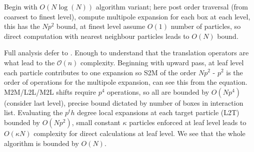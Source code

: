 Begin with $O(N\log(N))$ algorithm variant; here post order traversal (from
coarsest to finest level), compute multipole expansion for each box at each level,
this has the $Np^2$ bound, at finest level assume $O(1)$ number of particles, so
direct computation with nearest neighbour particles leads to $O(N)$ bound.

Full analysis defer to \cite{Greengard:1987:Yale}. Enough to understand that the
translation operators are what lead to the $\mathcal{O}(n)$ complexity. Beginning
with upward pass, at leaf level each particle contributes to one expansion so
S2M of the order $Np^2$ - $p^2$ is the order of operations for the multipole
expansion, can see this from the equation. M2M/L2L/M2L shifts require $p^4$
operations, so all are bounded by $O(Np^4)$ (consider last level), precise bound
dictated by number of boxes in interaction list. Evaluating the $p^th$ degree
local expansions at each target particle (L2T) bounded by $O(Np^2)$, small constant
$\kappa$ particles enforced at leaf level leads to $O(\kappa N)$ complexity for
direct calculations at leaf level. We see that the whole algorithm is bounded by
$O(N)$.

\hspace{10pt}
